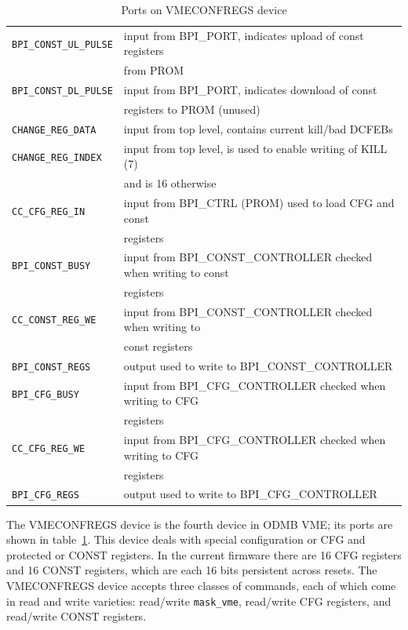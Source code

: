 \documentclass[10pt,a4paper]{article}
\begin{document}
\begin{table}[H]
\begin{tabular}{|l|l|}
\texttt{BPI\_CONST\_UL\_PULSE}& input from BPI\_PORT, indicates upload of const registers \\
                              & from PROM\\ \hline
\texttt{BPI\_CONST\_DL\_PULSE}& input from BPI\_PORT, indicates download of const \\
                              & registers to PROM (unused)\\ \hline
\texttt{CHANGE\_REG\_DATA}& input from top level, contains current kill/bad DCFEBs\\ \hline
\texttt{CHANGE\_REG\_INDEX}& input from top level, is used to enable writing of KILL (7) \\
                           & and is 16 otherwise\\ \hline
\texttt{CC\_CFG\_REG\_IN}& input from BPI\_CTRL (PROM) used to load CFG and const \\
                         & registers\\ \hline
\texttt{BPI\_CONST\_BUSY}& input from BPI\_CONST\_CONTROLLER checked when writing to const \\
                         & registers\\ \hline
\texttt{CC\_CONST\_REG\_WE}& input from BPI\_CONST\_CONTROLLER checked when writing to \\
                           & const registers\\ \hline
\texttt{BPI\_CONST\_REGS}& output used to write to BPI\_CONST\_CONTROLLER\\ \hline
\texttt{BPI\_CFG\_BUSY}& input from BPI\_CFG\_CONTROLLER checked when writing to CFG\\
                       & registers\\ \hline
\texttt{CC\_CFG\_REG\_WE}& input from BPI\_CFG\_CONTROLLER checked when writing to CFG\\
                         & registers\\ \hline
\texttt{BPI\_CFG\_REGS}& output used to write to BPI\_CFG\_CONTROLLER\\ \hline
\end{tabular}
\caption{Ports on VMECONFREGS device}
\label{tab:vmeconfregsinterface}
\end{table}

The VMECONFREGS device is the fourth device in ODMB VME; its ports are shown in table~\ref{tab:vmeconfregsinterface}. This device deals with special configuration or CFG and protected or CONST registers. In the current firmware there are 16 CFG registers and 16 CONST registers, which are each 16 bits persistent across resets. The VMECONFREGS device accepts three classes of commands, each of which come in read and write varieties: read/write \texttt{mask\_vme}, read/write CFG registers, and read/write CONST registers.
\end{document}
